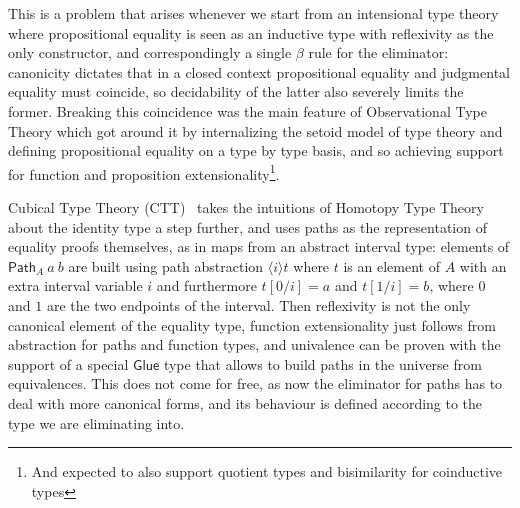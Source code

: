 \documentclass{book}
\begin{document}
  This is a problem that arises whenever we start from an intensional
  type theory where propositional equality is seen as an inductive
  type with reflexivity as the only constructor, and correspondingly a
  single $\beta$ rule for the eliminator: canonicity dictates that in
  a closed context propositional equality and judgmental equality must
  coincide, so decidability of the latter also severely limits the
  former. Breaking this coincidence was the main feature of Observational Type Theory \cite{ottnow} which got around it by
  internalizing the setoid model of type theory and defining
  propositional equality on a type by type basis, and so achieving
  support for function and proposition extensionality\footnote{And expected to also support quotient types and bisimilarity for coinductive types}.

  Cubical Type Theory (CTT)~\cite{cohenCoquandHuberMortberg:cubical} takes the intuitions of Homotopy
  Type Theory about the identity type a step further, and uses paths
  as the representation of equality proofs themselves, as in maps from
  an abstract interval type:
  elements of $\mathsf{Path}_A~a~b$ are built using path abstraction
  $\langle i \rangle t$ where $t$ is an element of $A$ with an extra
  interval variable $i$ and furthermore $t[0/i] = a$ and $t[1/i] = b$,
  where $0$ and $1$ are the two endpoints of the interval.
  Then reflexivity is not the only
  canonical element of the equality type, function extensionality just
  follows from abstraction for paths and function types, and
  univalence can be proven with the support of a special
  $\mathsf{Glue}$ type that allows to build paths in the universe from
  equivalences. This does not come for free, as now the eliminator for
  paths has to deal with more canonical forms, and its
  behaviour is defined according to the type we are eliminating into.
\end{document}
